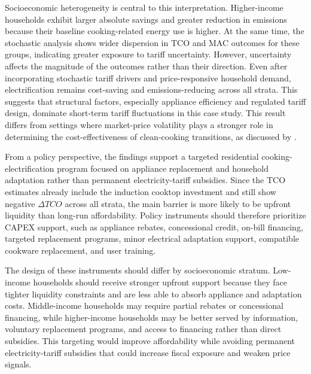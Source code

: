 \documentclass[authoryear,preprint,review,10pt]{elsarticle}
\begin{document}
Socioeconomic heterogeneity is central to this interpretation. Higher-income households exhibit larger absolute savings and greater reduction in emissions because their baseline cooking-related energy use is higher. At the same time, the stochastic analysis shows wider dispersion in TCO and MAC outcomes for these groups, indicating greater exposure to tariff uncertainty. However, uncertainty affects the magnitude of the outcomes rather than their direction. Even after incorporating stochastic tariff drivers and price-responsive household demand, electrification remains cost-saving and emissions-reducing across all strata. This suggests that structural factors, especially appliance efficiency and regulated tariff design, dominate short-term tariff fluctuations in this case study. This result differs from settings where market-price volatility plays a stronger role in determining the cost-effectiveness of clean-cooking transitions, as discussed by \citet{floess2023}.

From a policy perspective, the findings support a targeted residential cooking-electrification program focused on appliance replacement and household adaptation rather than permanent electricity-tariff subsidies. Since the TCO estimates already include the induction cooktop investment and still show negative $\Delta TCO$ across all strata, the main barrier is more likely to be upfront liquidity than long-run affordability. Policy instruments should therefore prioritize CAPEX support, such as appliance rebates, concessional credit, on-bill financing, targeted replacement programs, minor electrical adaptation support, compatible cookware replacement, and user training.

The design of these instruments should differ by socioeconomic stratum. Low-income households should receive stronger upfront support because they face tighter liquidity constraints and are less able to absorb appliance and adaptation costs. Middle-income households may require partial rebates or concessional financing, while higher-income households may be better served by information, voluntary replacement programs, and access to financing rather than direct subsidies. This targeting would improve affordability while avoiding permanent electricity-tariff subsidies that could increase fiscal exposure and weaken price signals.
\end{document}
